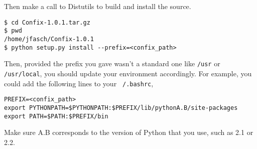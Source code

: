 Then make a call to Distutils to build and install the source.
\begin{verbatim}
$ cd Confix-1.0.1.tar.gz
$ pwd
/home/jfasch/Confix-1.0.1
$ python setup.py install --prefix=<confix_path>
\end{verbatim}

Then, provided the prefix you gave wasn't a standard one like
{\tt /usr} or {\tt /usr/local}, you should update your environment
accordingly. For example, you could add the following lines to your
{\tt ~/.bashrc},
\begin{verbatim}
PREFIX=<confix_path>
export PYTHONPATH=$PYTHONPATH:$PREFIX/lib/pythonA.B/site-packages
export PATH=$PATH:$PREFIX/bin
\end{verbatim}

Make sure A.B corresponds to the version of Python that you use, such
as 2.1 or 2.2.
